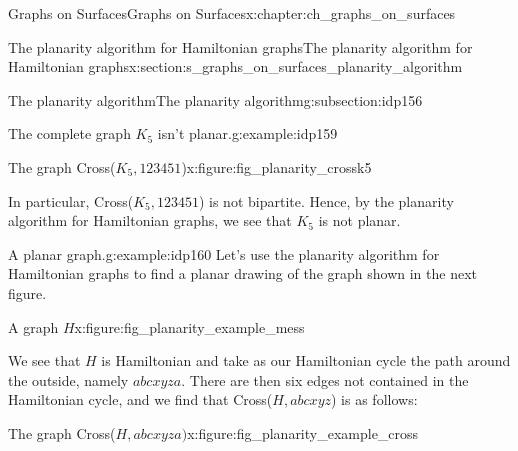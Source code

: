 \documentclass[oneside,10pt,]{book}
\numberwithin{equation}{section}
\begin{document}
\begin{chapterptx}{Graphs on Surfaces}{}{Graphs on Surfaces}{}{}{x:chapter:ch_graphs_on_surfaces}
\begin{sectionptx}{The planarity algorithm for Hamiltonian graphs}{}{The planarity algorithm for Hamiltonian graphs}{}{}{x:section:s_graphs_on_surfaces_planarity_algorithm}
\begin{subsectionptx}{The planarity algorithm}{}{The planarity algorithm}{}{}{g:subsection:idp156}
\begin{example}{The complete graph \(K_5\) isn't planar.}{g:example:idp159}
\begin{figureptx}{The graph Cross(\(K_5, 123451\))}{x:figure:fig_planarity_crossk5}{}
\begin{image}{0.15}{0.7}{0.15}
{\begin{tikzpicture}[scale=.7]
\end{tikzpicture}
}%
\end{image}%
\tcblower
\end{figureptx}%
In particular, Cross(\(K_5, 123451\)) is not bipartite.  Hence, by the planarity algorithm for Hamiltonian graphs, we see that \(K_5\) is not planar.%
\end{example}
\begin{example}{A planar graph.}{g:example:idp160}%
Let's use the planarity algorithm for Hamiltonian graphs to find a planar drawing of the graph shown in the next figure.%
\begin{figureptx}{A graph \(H\)}{x:figure:fig_planarity_example_mess}{}%
\begin{image}{0.15}{0.7}{0.15}%
%
\end{image}%
\tcblower
\end{figureptx}%
We see that \(H\) is Hamiltonian and take as our Hamiltonian cycle the path around the outside, namely \(abcxyza\).  There are then six edges not contained in the Hamiltonian cycle, and we find that Cross(\(H, abcxyz\)) is as follows:%
\begin{figureptx}{The graph Cross(\(H, abcxyza)\)}{x:figure:fig_planarity_example_cross}{}%
\begin{image}{0.15}{0.7}{0.15}%
\end{image}
\end{figureptx}
\end{example}
\end{subsectionptx}
\end{sectionptx}
\end{chapterptx}
\end{document}
